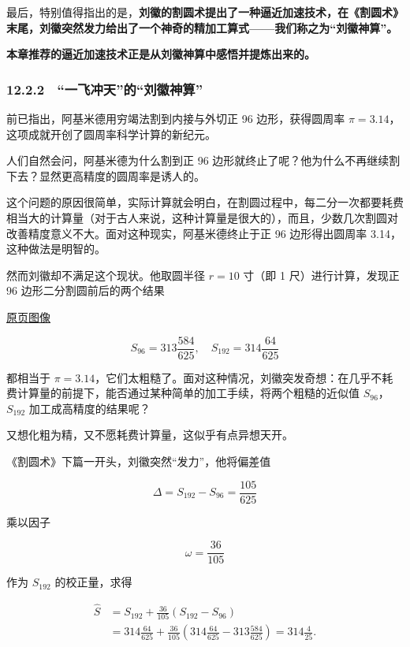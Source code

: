 \documentclass[
  10pt,
  fontset=fandol]{ctexart}
\begin{document}
最后，特别值得指出的是，\textbf{刘徽的割圆术提出了一种逼近加速技术，在《割圆术》末尾，刘徽突然发力给出了一个神奇的精加工算式------我们称之为``刘徽神算''。}

\textbf{本章推荐的逼近加速技术正是从刘徽神算中感悟并提炼出来的。}

\subsubsection{12.2.2　``一飞冲天''的``刘徽神算''}\label{ux4e00ux98deux51b2ux5929ux7684ux5218ux5fbdux795eux7b97}

前已指出，阿基米德用穷竭法割到内接与外切正 96 边形，获得圆周率 \(\pi=3.14\)，这项成就开创了圆周率科学计算的新纪元。

人们自然会问，阿基米德为什么割到正 96 边形就终止了呢？他为什么不再继续割下去？显然更高精度的圆周率是诱人的。

这个问题的原因很简单，实际计算就会明白，在割圆过程中，每二分一次都要耗费相当大的计算量（对于古人来说，这种计算量是很大的），而且，少数几次割圆对改善精度意义不大。面对这种现实，阿基米德终止于正 96 边形得出圆周率 3.14，这种做法是明智的。

然而刘徽却不满足这个现状。他取圆半径 \(r=10\) 寸（即 1 尺）进行计算，发现正 96 边形二分割圆前后的两个结果

\href{../../source-images/pdf-297.jpeg}{原页图像}

\[
S_{96}=313\frac{584}{625},\quad S_{192}=314\frac{64}{625}
\]

都相当于 \(\pi=3.14\)，它们太粗糙了。面对这种情况，刘徽突发奇想：在几乎不耗费计算量的前提下，能否通过某种简单的加工手续，将两个粗糙的近似值 \(S_{96}\)，\(S_{192}\) 加工成高精度的结果呢？

又想化粗为精，又不愿耗费计算量，这似乎有点异想天开。

《割圆术》下篇一开头，刘徽突然``发力''，他将偏差值

\[
\Delta=S_{192}-S_{96}=\frac{105}{625}
\]

乘以因子

\[
\omega=\frac{36}{105}
\tag{12.2.1}
\]

作为 \(S_{192}\) 的校正量，求得

\[
\begin{aligned}
\widehat S&=S_{192}+\frac{36}{105}(S_{192}-S_{96})\\
&=314\frac{64}{625}+\frac{36}{105}\left(314\frac{64}{625}-313\frac{584}{625}\right)=314\frac{4}{25}.
\end{aligned}
\tag{12.2.2}
\]
\end{document}
